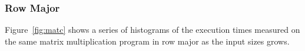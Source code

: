 \documentclass[10pt]{article}
\begin{document}

\clearpage
\pagebreak

\subsubsection{Row Major}

Figure~\ref{fig:matc} shows a series of 
histograms of the execution times measured on 
the same matrix multiplication program in row major as the input sizes grows. 
\end{document}
